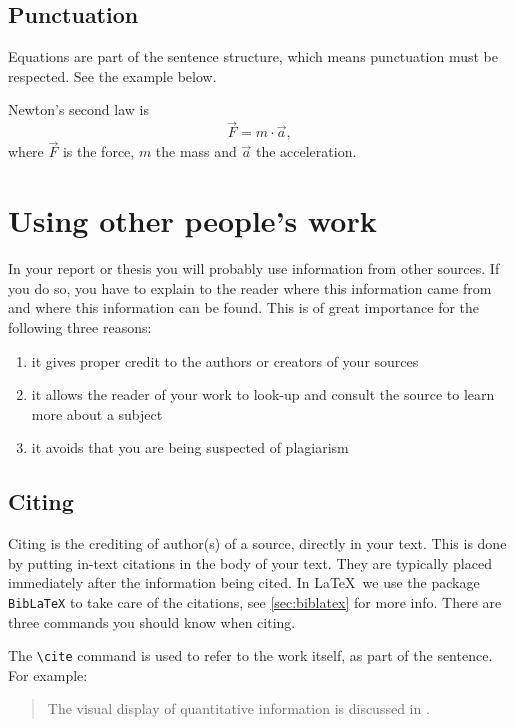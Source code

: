 \subsection{Punctuation}
Equations are part of the sentence structure, which means
punctuation must be respected. See the example below.

Newton's second law is
\begin{equation}\label{eq:newton}
    \vec{F} = m \cdot \vec{a},
\end{equation}
where $\vec{F}$  is the force,  $m$ the mass and $\vec{a}$ the acceleration.




\section{Using other people's work}\label{sec:formatcites}
In your report or thesis you will probably use information from other sources. If you do so, you have to explain to the reader where this information came from and where this information can be found. This is of great importance for the following three reasons:
\begin{enumerate}
    \item it gives proper credit to the authors or creators of your sources
    \item it allows the reader of your work to look-up and consult the source to learn more about a subject
    \item it avoids that you are being suspected of plagiarism
\end{enumerate}

\subsection{Citing}
Citing is the crediting of author(s) of a source, directly in your text. This is done by putting in-text citations in the body of your text. They are typically placed immediately after the information being cited. In \LaTeX\ we use the package \texttt{BibLaTeX} to take care of the citations, see \cref{sec:biblatex} for more info. There are three commands you should know when citing.

The \verb|\cite| command is used to refer to the work itself, as part of the sentence. For example:

\begin{quotation}
The visual display of quantitative information is discussed in \cite{tufte2001}.
\end{quotation}

